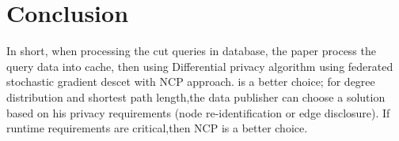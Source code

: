 \documentclass[journal,transmag]{IEEEtran}
\begin{document}
\section{Conclusion}
In short, when processing the cut queries in database, the paper process the query data into cache, then using Differential  privacy  algorithm  using  federated stochastic gradient descet with NCP approach. is a better choice; for degree distribution and shortest path length,the data publisher can choose a solution based on his privacy requirements (node re-identification or edge disclosure). If runtime requirements are critical,then NCP is a better choice.

%

\ifCLASSOPTIONcaptionsoff
  \newpage
\fi
\end{document}
